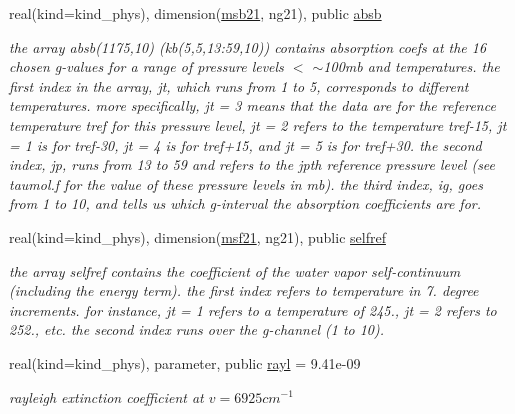\begin{Indent}
\begin{DoxyCompactItemize}
real(kind=kind\+\_\+phys), dimension(\hyperlink{group__module__radsw__kgbnn_ga59710ca5b31c30385ea968c0f01e2e81}{msb21}, ng21), public \hyperlink{group__module__radsw__kgbnn_ga1d3f12f050c90be49f109205c463b29b}{absb}
\begin{DoxyCompactList}\small\item\em the array absb(1175,10) (kb(5,5,13\+:59,10)) contains absorption coefs at the 16 chosen g-\/values for a range of pressure levels $<$ $\sim$100mb and temperatures. the first index in the array, jt, which runs from 1 to 5, corresponds to different temperatures. more specifically, jt = 3 means that the data are for the reference temperature tref for this pressure level, jt = 2 refers to the temperature tref-\/15, jt = 1 is for tref-\/30, jt = 4 is for tref+15, and jt = 5 is for tref+30. the second index, jp, runs from 13 to 59 and refers to the jpth reference pressure level (see taumol.\+f for the value of these pressure levels in mb). the third index, ig, goes from 1 to 10, and tells us which g-\/interval the absorption coefficients are for. \end{DoxyCompactList}\item 
real(kind=kind\+\_\+phys), dimension(\hyperlink{group__module__radsw__kgbnn_gae70b5abfa847419cbf189d2502c34ddd}{msf21}, ng21), public \hyperlink{group__module__radsw__kgbnn_ga76fc3e4566fcee982b99b10ea562ba93}{selfref}
\begin{DoxyCompactList}\small\item\em the array selfref contains the coefficient of the water vapor self-\/continuum (including the energy term). the first index refers to temperature in 7. degree increments. for instance, jt = 1 refers to a temperature of 245., jt = 2 refers to 252., etc. the second index runs over the g-\/channel (1 to 10). \end{DoxyCompactList}\item 
real(kind=kind\+\_\+phys), parameter, public \hyperlink{group__module__radsw__kgbnn_ga8df418599fb8aef5fc8f2935a913b361}{rayl} = 9.\+41e-\/09
\begin{DoxyCompactList}\small\item\em rayleigh extinction coefficient at $v=6925cm^{-1}$ \end{DoxyCompactList}\end{DoxyCompactItemize}
\end{Indent}
